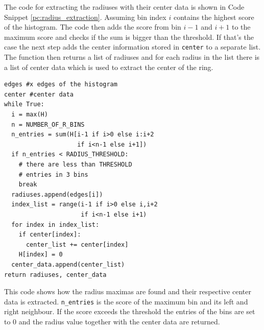 \documentclass[11pt,twoside]{scrreprt}
\begin{document}
The code for extracting the radiuses with their center data is shown in Code Snippet \ref{pc:radius_extraction}. Assuming bin index $i$ 
contains the highest score of the histogram. The code then adds the score from bin $i-1$ and $i+1$ to the maximum score and checks if 
the sum is bigger than the threshold. If that's the case the next step adds the center information stored in \texttt{center} to a separate
list. The function then returns a list of radiuses and for each radius in the list there is a list of center data which is used to 
extract the center of the ring.
\begin{codesnippet}
  \begin{lstlisting}
edges #x edges of the histogram
center #center data
while True:
  i = max(H)
  n = NUMBER_OF_R_BINS 
  n_entries = sum(H[i-1 if i>0 else i:i+2 
                    if i<n-1 else i+1])
  if n_entries < RADIUS_THRESHOLD:
    # there are less than THRESHOLD
    # entries in 3 bins
    break
  radiuses.append(edges[i])
  index_list = range(i-1 if i>0 else i,i+2 
                     if i<n-1 else i+1)
  for index in index_list:
    if center[index]:
      center_list += center[index]
    H[index] = 0
  center_data.append(center_list)    
return radiuses, center_data 
\end{lstlisting}
\caption[Radius extraction algorithm]{This code shows how the radius maximas are found and their respective center data is extracted.
\texttt{n\_entries} is the score of the maximum bin and its left and right neighbour. If the score exceeds the threshold the entries of the
bins are set to 0 and the radius value together with the center data are returned.}\label{pc:radius_extraction}
\end{codesnippet}
\end{document}
